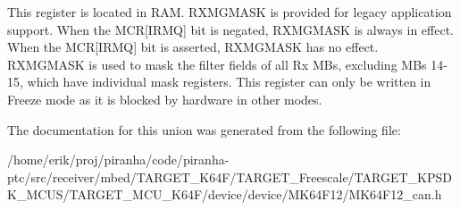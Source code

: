 This register is located in R\+AM. R\+X\+M\+G\+M\+A\+SK is provided for legacy application support. When the M\+CR\mbox{[}I\+R\+MQ\mbox{]} bit is negated, R\+X\+M\+G\+M\+A\+SK is always in effect. When the M\+CR\mbox{[}I\+R\+MQ\mbox{]} bit is asserted, R\+X\+M\+G\+M\+A\+SK has no effect. R\+X\+M\+G\+M\+A\+SK is used to mask the filter fields of all Rx M\+Bs, excluding M\+Bs 14-\/15, which have individual mask registers. This register can only be written in Freeze mode as it is blocked by hardware in other modes. 

The documentation for this union was generated from the following file\+:\begin{DoxyCompactItemize}
\item 
/home/erik/proj/piranha/code/piranha-\/ptc/src/receiver/mbed/\+T\+A\+R\+G\+E\+T\+\_\+\+K64\+F/\+T\+A\+R\+G\+E\+T\+\_\+\+Freescale/\+T\+A\+R\+G\+E\+T\+\_\+\+K\+P\+S\+D\+K\+\_\+\+M\+C\+U\+S/\+T\+A\+R\+G\+E\+T\+\_\+\+M\+C\+U\+\_\+\+K64\+F/device/device/\+M\+K64\+F12/M\+K64\+F12\+\_\+can.\+h\end{DoxyCompactItemize}
